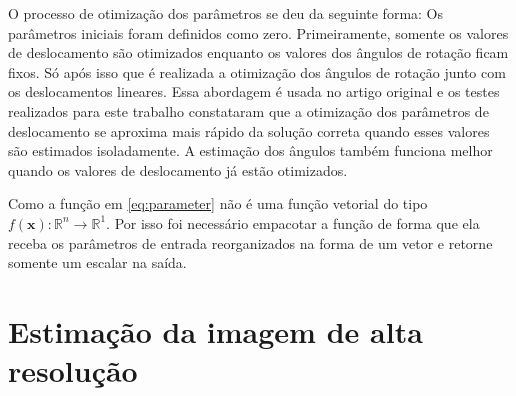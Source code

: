 
O processo de otimização dos parâmetros se deu da seguinte forma:
Os parâmetros iniciais foram definidos como zero.
Primeiramente, somente os valores de deslocamento são otimizados enquanto os valores dos ângulos de rotação ficam fixos.
Só após isso que é realizada a otimização dos ângulos de rotação junto com os deslocamentos lineares.
Essa abordagem é usada no artigo original e os testes realizados para este trabalho
constataram que a otimização dos parâmetros de deslocamento se aproxima mais rápido da
solução correta quando esses valores são estimados isoladamente.
A estimação dos ângulos também funciona melhor quando os valores de deslocamento já estão
otimizados.

Como a função em \ref{eq:parameter} não é uma função vetorial do tipo $ f(\mathbf{x}) : \mathbb{R}^n \to \mathbb{R}^1 $.
Por isso foi necessário empacotar a função de forma que ela receba os parâmetros de
entrada reorganizados na forma de um vetor e retorne somente um escalar na saída.


\section{Estimação da imagem de alta resolução}
